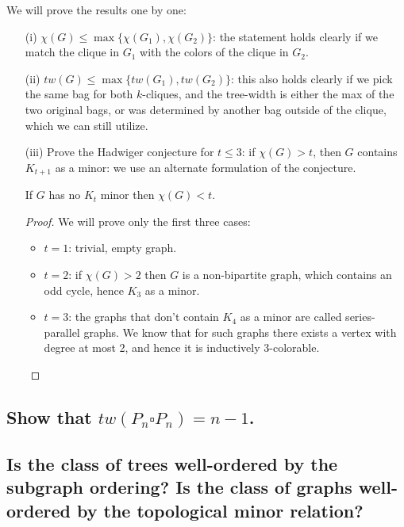 We will prove the results one by one:
\begin{itemize}
    \item[(i)] $\chi(G) \leq \max\{\chi(G_1), \chi(G_2)\}$:
        the statement holds clearly if we match the clique in $G_1$ with the colors of the clique in $G_2$. 
    \item[(ii)] $tw(G) \leq \max\{tw(G_1), tw(G_2)\}$:
        this also holds clearly if we pick the same bag for both $k$-cliques, and the tree-width is either the max of the two original bags, or was determined by another bag outside of the clique, which we can still utilize.
    \item[(iii)] Prove the Hadwiger conjecture for $t \leq 3$: if $\chi(G) > t$, then $G$ contains $K_{t+1}$ as a minor:
        we use an alternate formulation of the conjecture.
        \begin{theorem}
            If $G$ has no $K_t$ minor then $\chi(G) < t$.
        \end{theorem}
        \begin{proof}
            We will prove only the first three cases:
            \begin{itemize}
                \item $t = 1$: trivial, empty graph.
                \item $t = 2$: if $\chi(G) > 2$ then $G$ is a non-bipartite graph, which contains an odd cycle, hence $K_3$ as a minor.
                \item $t = 3$: the graphs that don't contain $K_4$ as a minor are called series-parallel graphs. We know that for such graphs there exists a vertex with degree at most 2, and hence it is inductively 3-colorable.
            \end{itemize}
        \end{proof}
\end{itemize}

\subsection[Minors 2 - 5]{Show that $tw(P_n \square P_n) = n-1$.}

\newpage

\subsection[Minors 2 - 7]{Is the class of trees well-ordered by the subgraph ordering? Is the class of graphs well-ordered by the topological minor relation?}


